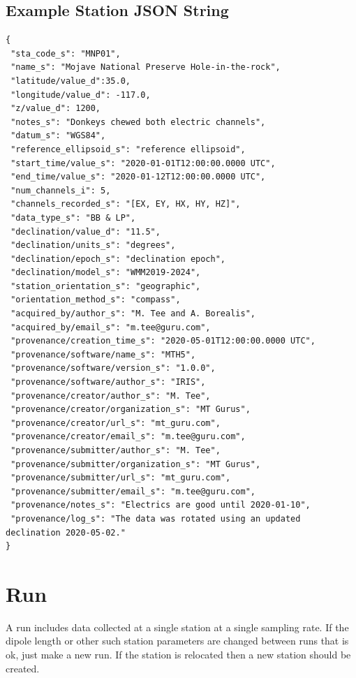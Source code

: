 \documentclass{article}
\begin{document}
\newpage
\subsection{Example Station JSON String}

\begin{verbatim}
{
 "sta_code_s": "MNP01",
 "name_s": "Mojave National Preserve Hole-in-the-rock",
 "latitude/value_d":35.0,
 "longitude/value_d": -117.0,
 "z/value_d": 1200,
 "notes_s": "Donkeys chewed both electric channels",
 "datum_s": "WGS84",
 "reference_ellipsoid_s": "reference ellipsoid",
 "start_time/value_s": "2020-01-01T12:00:00.0000 UTC",
 "end_time/value_s": "2020-01-12T12:00:00.0000 UTC",
 "num_channels_i": 5,
 "channels_recorded_s": "[EX, EY, HX, HY, HZ]",
 "data_type_s": "BB & LP",
 "declination/value_d": "11.5",
 "declination/units_s": "degrees",
 "declination/epoch_s": "declination epoch",
 "declination/model_s": "WMM2019-2024",
 "station_orientation_s": "geographic",
 "orientation_method_s": "compass",
 "acquired_by/author_s": "M. Tee and A. Borealis",
 "acquired_by/email_s": "m.tee@guru.com",
 "provenance/creation_time_s": "2020-05-01T12:00:00.0000 UTC",
 "provenance/software/name_s": "MTH5",
 "provenance/software/version_s": "1.0.0",
 "provenance/software/author_s": "IRIS",
 "provenance/creator/author_s": "M. Tee",
 "provenance/creator/organization_s": "MT Gurus",
 "provenance/creator/url_s": "mt_guru.com",
 "provenance/creator/email_s": "m.tee@guru.com",
 "provenance/submitter/author_s": "M. Tee",
 "provenance/submitter/organization_s": "MT Gurus",
 "provenance/submitter/url_s": "mt_guru.com",
 "provenance/submitter/email_s": "m.tee@guru.com",
 "provenance/notes_s": "Electrics are good until 2020-01-10",
 "provenance/log_s": "The data was rotated using an updated declination 2020-05-02."
}
\end{verbatim}

\newpage
\section{Run}

A run includes data collected at a single station at a single sampling rate.  If the dipole length or other such station parameters are changed between runs that is ok, just make a new run.  If the station is relocated then a new station should be created.
\end{document}
